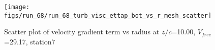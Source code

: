 \begin{figure}[H]
\centering
\texttt{[image: figs/run\_68/run\_68\_turb\_visc\_ettap\_bot\_vs\_r\_mesh\_scatter]}
\caption{Scatter plot of velocity gradient term vs radius at $z/c$=10.00, $V_{free}$=29.17, station7}
\label{fig:run_68_turb_visc_ettap_bot_vs_r_mesh_scatter}
\end{figure}


